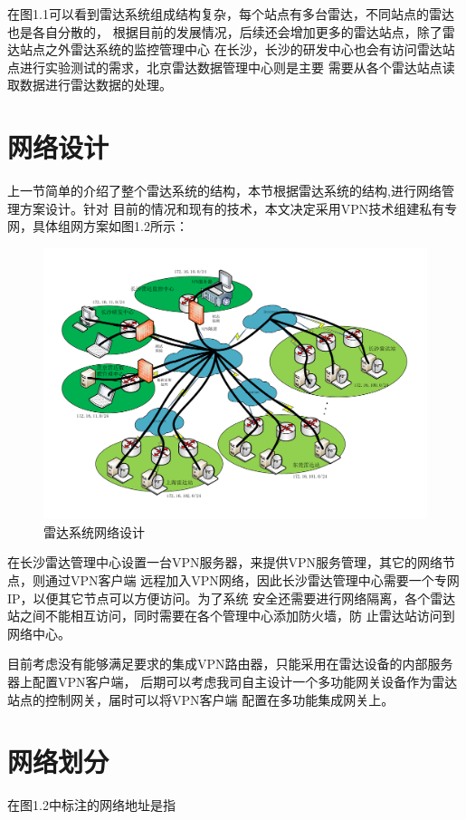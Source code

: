 \documentclass[a4paper,12pt]{report}
\begin{document}
\begin{spacing}{1.5}
在图1.1可以看到雷达系统组成结构复杂，每个站点有多台雷达，不同站点的雷达也是各自分散的，
根据目前的发展情况，后续还会增加更多的雷达站点，除了雷达站点之外雷达系统的监控管理中心
在长沙，长沙的研发中心也会有访问雷达站点进行实验测试的需求，北京雷达数据管理中心则是主要
需要从各个雷达站点读取数据进行雷达数据的处理。

\section{网络设计}
上一节简单的介绍了整个雷达系统的结构，本节根据雷达系统的结构,进行网络管理方案设计。针对
目前的情况和现有的技术，本文决定采用VPN技术组建私有专网，具体组网方案如图1.2所示：
\begin{figure}[hbtp]
	\centering
	\includegraphics [width=1.0\textwidth]{figure//RadarNet.pdf}
	\caption{雷达系统网络设计}\label{RadarNet}
\end{figure}

在长沙雷达管理中心设置一台VPN服务器，来提供VPN服务管理，其它的网络节点，则通过VPN客户端
远程加入VPN网络，因此长沙雷达管理中心需要一个专网IP，以便其它节点可以方便访问。为了系统
安全还需要进行网络隔离，各个雷达站之间不能相互访问，同时需要在各个管理中心添加防火墙，防
止雷达站访问到网络中心。

目前考虑没有能够满足要求的集成VPN路由器，只能采用在雷达设备的内部服务器上配置VPN客户端，
后期可以考虑我司自主设计一个多功能网关设备作为雷达站点的控制网关，届时可以将VPN客户端
配置在多功能集成网关上。

\section{网络划分}
在图1.2中标注的网络地址是指

\end{spacing}
\end{document}

